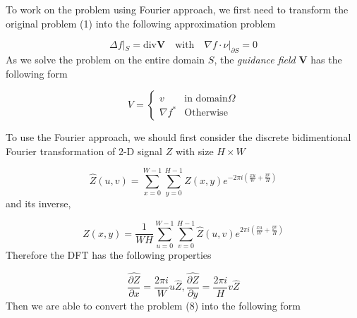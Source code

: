 \documentclass[11pt]{article}
\begin{document}
	To work on the problem using Fourier approach, we first need to transform the original problem (1) into the following approximation problem
	
	\begin{equation}
		\Delta f|_S = \text{div} \boldsymbol{V} \quad \text{with} \quad \nabla f \cdot \nu |_{\partial S} = 0
	\end{equation}
	As we solve the problem on the entire domain $S$, the \textit{guidance field} $\boldsymbol{V}$ has the following form
	
	\begin{equation}
		V = 
		\begin{cases}
			v & \text{in domain} \Omega\\
			\nabla f^* & \text{Otherwise}
		\end{cases}
	\end{equation}
	
	To use the Fourier approach, we should first consider the discrete bidimentional Fourier transformation of 2-D signal $Z$ with size $H \times W$
	
	\begin{equation}
		\hat{Z}(u,v) = \sum\limits_{x = 0}^{W - 1}\sum\limits_{y = 0}^{H - 1} Z(x,y)e^{-2\pi i (\frac{xu}{W} + \frac{yv}{H})}
	\end{equation}
	and its inverse,
	
	\begin{equation}
		Z(x,y) = \frac{1}{WH} \sum_{u = 0}^{W - 1}\sum_{v = 0}^{H - 1}\hat{Z}(u,v)e^{2\pi i (\frac{xu}{W} + \frac{yv}{H})}
	\end{equation}
	Therefore the DFT has the following properties
	
	\begin{equation}
		\frac{\widehat{\partial Z}}{\partial x} = \frac{2 \pi i}{W} u \hat{Z}, \frac{\widehat{\partial Z}}{\partial y} = \frac{2 \pi i}{H} v \hat{Z}
	\end{equation}
	Then we are able to convert the problem (8) into the following form
	
\end{document}
